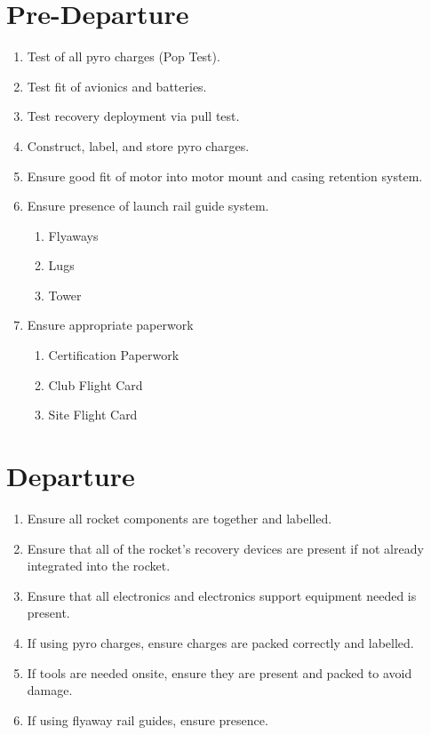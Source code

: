 \documentclass[12pt]{article}
\begin{document}
\section{Pre-Departure}
\begin{addmargin}[3em]{3em}
	\begin{enumerate}[label=\thesection.\arabic*\quad$\square$]
		\item Test of all pyro charges (Pop Test).
		\item Test fit of avionics and batteries.
		\item Test recovery deployment via pull test.
		\item Construct, label, and store pyro charges.
		\item Ensure good fit of motor into motor mount and casing retention system.
		\item Ensure presence of launch rail guide system.
		\begin{enumerate} [label=\thesection.\arabic{enumi}.\arabic*\quad$\square$]
			\item Flyaways
			\item Lugs
			\item Tower
		\end{enumerate}
		\item Ensure appropriate paperwork
		\begin{enumerate} [label=\thesection.\arabic{enumi}.\arabic*\quad$\square$]
			\item Certification Paperwork
			\item Club Flight Card
			\item Site Flight Card
		\end{enumerate}
	\end{enumerate}
\end{addmargin}
\section{Departure}
\begin{addmargin}[3em]{3em}
	\begin{enumerate}[label=\thesection.\arabic*\quad$\square$]
		\item Ensure all rocket components are together and labelled.
		\item Ensure that all of the rocket's recovery devices are present if not already integrated into the rocket.
		\item Ensure that all electronics and electronics support equipment needed is present.
		\item If using pyro charges, ensure charges are packed correctly and labelled.
		\item If tools are needed onsite, ensure they are present and packed to avoid damage.
		\item If using flyaway rail guides, ensure presence.
	\end{enumerate}
\end{addmargin}
\end{document}
